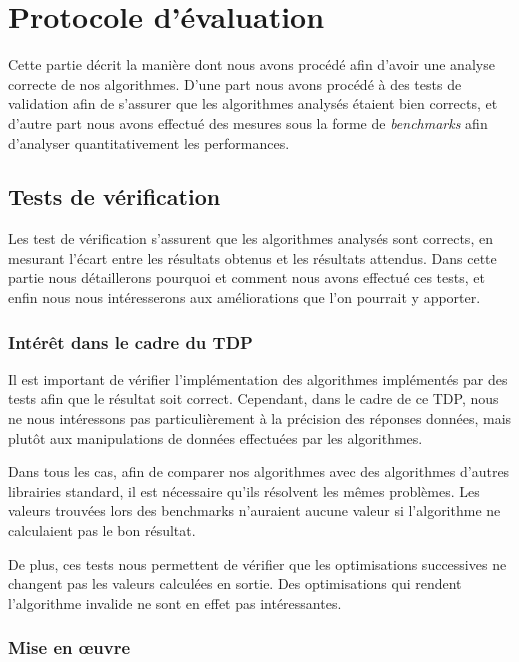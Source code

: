 \section{Protocole d'évaluation}

Cette partie décrit la manière dont nous avons procédé afin d'avoir une analyse correcte de nos algorithmes. D'une part nous avons procédé à des tests de validation afin de s'assurer que les algorithmes analysés étaient bien corrects, et d'autre part nous avons effectué des mesures sous la forme de \emph{benchmarks} afin d'analyser quantitativement les performances.

\subsection{Tests de vérification}

Les test de vérification s'assurent que les algorithmes analysés sont corrects, en mesurant l'écart entre les résultats obtenus et les résultats attendus. Dans cette partie nous détaillerons pourquoi et comment nous avons effectué ces tests, et enfin nous nous intéresserons aux améliorations que l'on pourrait y apporter.


\subsubsection{Intérêt dans le cadre du TDP}

Il est important de vérifier l'implémentation des algorithmes implémentés par des tests afin que le résultat soit correct. Cependant, dans le cadre de ce TDP, nous ne nous intéressons pas particulièrement à la précision des réponses données, mais plutôt aux manipulations de données effectuées par les algorithmes. 

Dans tous les cas, afin de comparer nos algorithmes avec des algorithmes d'autres librairies standard, il est nécessaire qu'ils résolvent les mêmes problèmes. Les valeurs trouvées lors des benchmarks n'auraient aucune valeur si l'algorithme ne calculaient pas le bon résultat.

De plus, ces tests nous permettent de vérifier que les optimisations successives ne changent pas les valeurs calculées en sortie. Des optimisations qui rendent l'algorithme invalide ne sont en effet pas intéressantes.

    
\subsubsection{Mise en \oe uvre}

